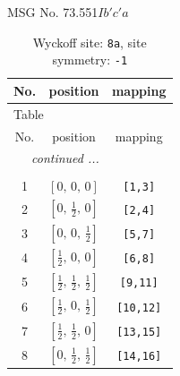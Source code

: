 \documentclass[fleqn,8pt]{jsarticle}
\begin{document}
\setcounter{MaxMatrixCols}{32}

\renewcommand{\tablename}{Table~}
\renewcommand{\figurename}{Figure~}
\begin{center}
\LARGE
MSG No. 73.551\quad$Ib'c'a$
\end{center}
\renewcommand{\arraystretch}{1.2}
\begin{longtable}{ccc}
\caption{Wyckoff site: {\tt 8a}, site symmetry: {\tt -1}}
 \\
 \hline \hline
No. & position & mapping \\ \hline \endfirsthead

\multicolumn{2}{l}{\tablename\ \thetable{}} \\
 \hline \hline
No. & position & mapping \\ \hline \endhead

 \hline \hline
\multicolumn{2}{r}{\footnotesize\it continued ...} \\ \endfoot

 \hline \hline
\multicolumn{2}{r}{} \\ \endlastfoot

1 & $\left[ 0,\, 0,\, 0 \right]$ & {\tt [1,3]} \\ \hline
2 & $\left[ 0,\, \frac{1}{2},\, 0 \right]$ & {\tt [2,4]} \\ \hline
3 & $\left[ 0,\, 0,\, \frac{1}{2} \right]$ & {\tt [5,7]} \\ \hline
4 & $\left[ \frac{1}{2},\, 0,\, 0 \right]$ & {\tt [6,8]} \\ \hline
5 & $\left[ \frac{1}{2},\, \frac{1}{2},\, \frac{1}{2} \right]$ & {\tt [9,11]} \\ \hline
6 & $\left[ \frac{1}{2},\, 0,\, \frac{1}{2} \right]$ & {\tt [10,12]} \\ \hline
7 & $\left[ \frac{1}{2},\, \frac{1}{2},\, 0 \right]$ & {\tt [13,15]} \\ \hline
8 & $\left[ 0,\, \frac{1}{2},\, \frac{1}{2} \right]$ & {\tt [14,16]} \\
\end{longtable}
\renewcommand{\arraystretch}{1.2}
\end{document}
